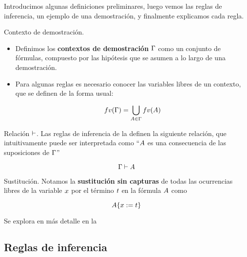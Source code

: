 Introducimos algunas definiciones preliminares, luego vemos las reglas de inferencia, un ejemplo de una demostración, y finalmente explicamos cada regla.

\begin{definition}{Contexto de demostración.}
    \begin{itemize}
        \item Definimos los \textbf{contextos de demostración} $\Gamma$ como un conjunto de fórmulas, compuesto por las hipótesis que se asumen a lo largo de una demostración.
        \item Para algunas reglas es necesario conocer las variables libres de un contexto, que se definen de la forma usual:
        
        \[
            fv(\Gamma) = \bigcup_{A \in \Gamma} fv(A)
        \]
    \end{itemize}
\end{definition}

\begin{definition}{Relación $\vdash$.}
    Las reglas de inferencia de la  definen la siguiente relación, que intuitivamente puede ser interpretada como ``$A$ es una consecuencia de las suposiciones de $\Gamma$''

    \[ \Gamma \vdash A \]
\end{definition}

\begin{definition}{Sustitución.}
    Notamos la \textbf{sustitución sin capturas} de todas las ocurrencias libres de la variable $x$ por el término $t$ en la fórmula $A$ como

    \[
        A \{x := t\}
    \]

    Se explora en más detalle en la 
\end{definition}

\subsection{Reglas de inferencia}

